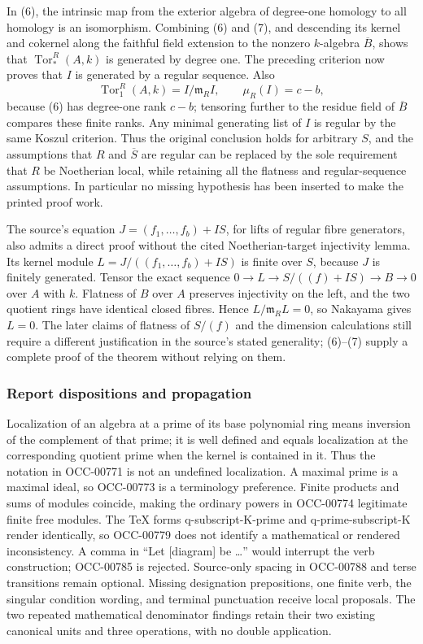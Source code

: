 In (6), the intrinsic map from the exterior algebra of degree-one homology to all homology is an isomorphism. Combining (6) and (7), and descending its kernel and cokernel along the faithful field extension to the nonzero \(k\)-algebra \(\overline B\), shows that \(\operatorname{Tor}^R_*(A,k)\) is generated by degree one. The preceding criterion now proves that \(I\) is generated by a regular sequence. Also \[
\operatorname{Tor}^R_1(A,k)=I/\mathfrak m_RI,
\qquad \mu_R(I)=c-b,
\] because (6) has degree-one rank \(c-b\); tensoring further to the residue field of \(\overline B\) compares these finite ranks. Any minimal generating list of \(I\) is regular by the same Koszul criterion. Thus the original conclusion holds for arbitrary \(S\), and the assumptions that \(R\) and \(\overline S\) are regular can be replaced by the sole requirement that \(R\) be Noetherian local, while retaining all the flatness and regular-sequence assumptions. In particular no missing hypothesis has been inserted to make the printed proof work.

The source's equation \(J=(f_1,\ldots,f_b)+IS\), for lifts of regular fibre generators, also admits a direct proof without the cited Noetherian-target injectivity lemma. Its kernel module \(L=J/((f_1,\ldots,f_b)+IS)\) is finite over \(S\), because \(J\) is finitely generated. Tensor the exact sequence \(0\to L\to S/((f)+IS)\to B\to0\) over \(A\) with \(k\). Flatness of \(B\) over \(A\) preserves injectivity on the left, and the two quotient rings have identical closed fibres. Hence \(L/\mathfrak m_RL=0\), so Nakayama gives \(L=0\). The later claims of flatness of \(S/(f)\) and the dimension calculations still require a different justification in the source's stated generality; (6)--(7) supply a complete proof of the theorem without relying on them.

\subsubsection{Report dispositions and propagation}\label{algebra-proof-045-report-dispositions-and-propagation}

Localization of an algebra at a prime of its base polynomial ring means inversion of the complement of that prime; it is well defined and equals localization at the corresponding quotient prime when the kernel is contained in it. Thus the notation in OCC-00771 is not an undefined localization. A maximal prime is a maximal ideal, so OCC-00773 is a terminology preference. Finite products and sums of modules coincide, making the ordinary powers in OCC-00774 legitimate finite free modules. The TeX forms q-subscript-K-prime and q-prime-subscript-K render identically, so OCC-00779 does not identify a mathematical or rendered inconsistency. A comma in ``Let {[}diagram{]} be \ldots'' would interrupt the verb construction; OCC-00785 is rejected. Source-only spacing in OCC-00788 and terse transitions remain optional. Missing designation prepositions, one finite verb, the singular condition wording, and terminal punctuation receive local proposals. The two repeated mathematical denominator findings retain their two existing canonical units and three operations, with no double application.

